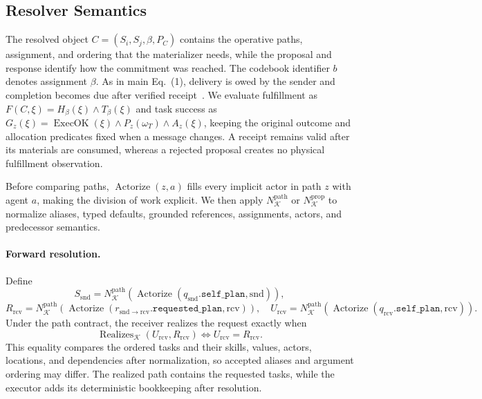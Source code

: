 \documentclass[sigconf,nonacm,balance=false]{aamas}
\begin{document}
\subsection{Resolver Semantics}

The resolved object $C=(S_i,S_j,\beta,P_C)$ contains the operative paths, assignment, and ordering that the materializer needs, while the proposal and response identify how the commitment was reached. The codebook identifier $b$ denotes assignment $\beta$. As in main Eq.~(1), delivery is owed by the sender and completion becomes due after verified receipt~\cite{singh2008commitments,chopra2025azorus}. We evaluate fulfillment as $F(C,\xi)=H_\beta(\xi)\land T_\beta(\xi)$ and task success as $G_z(\xi)=\operatorname{ExecOK}(\xi)\land P_z(\omega_T)\land A_z(\xi)$, keeping the original outcome and allocation predicates fixed when a message changes. A receipt remains valid after its materials are consumed, whereas a rejected proposal creates no physical fulfillment observation.

Before comparing paths, $\operatorname{Actorize}(z,a)$ fills every implicit actor in path $z$ with agent $a$, making the division of work explicit. We then apply $N_{\mathcal K}^{\mathrm{path}}$ or $N_{\mathcal K}^{\mathrm{prop}}$ to normalize aliases, typed defaults, grounded references, assignments, actors, and predecessor semantics.

\paragraph{Forward resolution.}
Define
\[
S_{\mathrm{snd}}=N_{\mathcal K}^{\mathrm{path}}\!\left(\operatorname{Actorize}(q_{\mathrm{snd}}.\mathtt{self\_plan},\mathrm{snd})\right),
\]
\[
R_{\mathrm{rcv}}=N_{\mathcal K}^{\mathrm{path}}\!\left(\operatorname{Actorize}(r_{\mathrm{snd}\rightarrow\mathrm{rcv}}.\mathtt{requested\_plan},\mathrm{rcv})\right),
\quad
U_{\mathrm{rcv}}=N_{\mathcal K}^{\mathrm{path}}\!\left(\operatorname{Actorize}(q_{\mathrm{rcv}}.\mathtt{self\_plan},\mathrm{rcv})\right).
\]
Under the path contract, the receiver realizes the request exactly when
\begin{equation}
\operatorname{Realizes}_{\mathcal K}(U_{\mathrm{rcv}},R_{\mathrm{rcv}})
\iff U_{\mathrm{rcv}}=R_{\mathrm{rcv}}.
\label{eq:realizes}
\end{equation}
This equality compares the ordered tasks and their skills, values, actors, locations, and dependencies after normalization, so accepted aliases and argument ordering may differ. The realized path contains the requested tasks, while the executor adds its deterministic bookkeeping after resolution.
\end{document}
